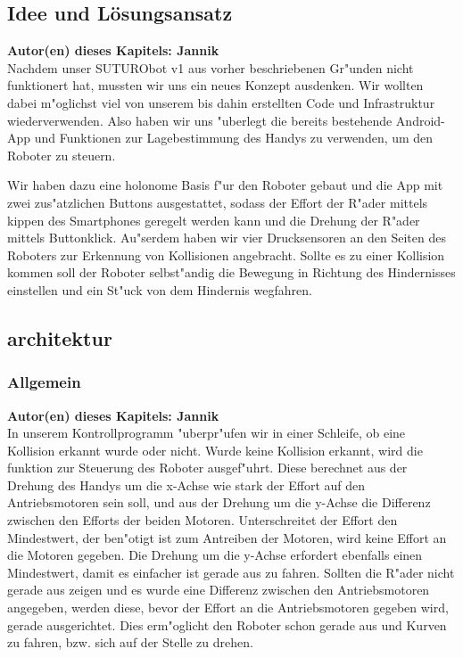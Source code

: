 \documentclass[8pt]{article}
\newcommand{\secauthor}[1]{\textbf{Autor(en) dieses Kapitels: {#1}}\\}
\begin{document}
\subsection{Idee und Lösungsansatz} 
\secauthor{Jannik}
Nachdem unser SUTURObot v1 aus vorher beschriebenen Gr"unden nicht funktionert hat, mussten wir uns ein neues Konzept ausdenken. Wir wollten dabei m"oglichst viel von unserem bis dahin erstellten Code und Infrastruktur wiederverwenden. Also haben wir uns "uberlegt die bereits bestehende Android-App und Funktionen zur Lagebestimmung des Handys zu verwenden, um den Roboter zu steuern.

Wir haben dazu eine holonome Basis f"ur den Roboter gebaut und die App mit zwei zus"atzlichen Buttons ausgestattet, sodass der Effort der R"ader mittels kippen des Smartphones geregelt werden kann und die Drehung der R"ader mittels Buttonklick. Au"serdem haben wir vier Drucksensoren an den Seiten des Roboters zur Erkennung von Kollisionen angebracht. Sollte es zu einer Kollision kommen soll der Roboter selbst"andig die Bewegung in Richtung des Hindernisses einstellen und ein St"uck von dem Hindernis wegfahren.

\subsection{architektur}

\subsubsection{Allgemein}
\secauthor{Jannik}
In unserem Kontrollprogramm "uberpr"ufen wir in einer Schleife, ob eine Kollision erkannt wurde oder nicht. Wurde keine Kollision erkannt, wird die funktion zur Steuerung des Roboter ausgef"uhrt. Diese berechnet aus der Drehung des Handys um die x-Achse wie stark der Effort auf den Antriebsmotoren sein soll, und aus der Drehung um die y-Achse die Differenz zwischen den Efforts der beiden Motoren. Unterschreitet der Effort den Mindestwert, der ben"otigt ist zum Antreiben der Motoren, wird keine Effort an die Motoren gegeben. Die Drehung um die y-Achse erfordert ebenfalls einen Mindestwert, damit es einfacher ist gerade aus zu fahren. Sollten die R"ader nicht gerade aus zeigen und es wurde eine Differenz zwischen den Antriebsmotoren angegeben, werden diese, bevor der Effort an die Antriebsmotoren gegeben wird, gerade ausgerichtet. Dies erm"oglicht den Roboter schon gerade aus und Kurven zu fahren, bzw. sich auf der Stelle zu drehen.
\end{document}
